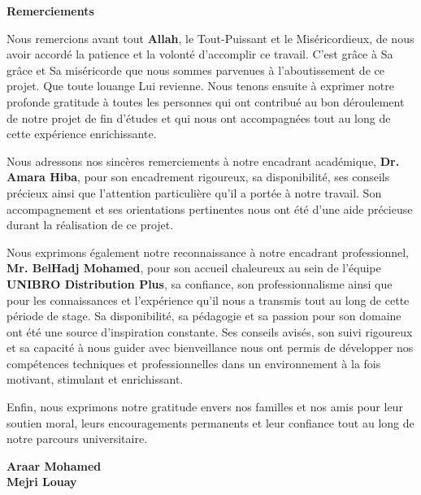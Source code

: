 \begin{titlepage}
\thispagestyle{empty}
\vspace*{0.5cm}
\begin{center}
{\Huge \textbf{Remerciements}}
\end{center}
\vspace{0.5cm}

Nous remercions avant tout \textbf{Allah}, le Tout-Puissant et le
Miséricordieux, de nous avoir accordé la patience et la volonté d'accomplir ce travail. C'est grâce à Sa grâce et Sa
miséricorde que nous sommes parvenues à l'aboutissement de ce projet.
Que toute louange Lui revienne.
Nous tenons ensuite à exprimer notre profonde gratitude à toutes les
personnes qui ont contribué au bon déroulement de notre projet de fin
d'études et qui nous ont accompagnées tout au long de cette expérience
enrichissante.

\vspace{0.3cm}

Nous adressons nos sincères remerciements à notre encadrant académique,
\textbf{Dr. Amara Hiba}, pour son encadrement rigoureux, sa disponibilité,
ses conseils précieux ainsi que l'attention particulière qu'il a portée à
notre travail. Son accompagnement et ses orientations pertinentes nous ont
été d'une aide précieuse durant la réalisation de ce projet.

\vspace{0.3cm}

Nous exprimons également notre reconnaissance à notre encadrant professionnel,
\textbf{Mr. BelHadj Mohamed}, pour son accueil chaleureux au sein de
l'équipe \textbf{UNIBRO Distribution Plus}, sa confiance, son professionnalisme ainsi
que pour les connaissances et l'expérience qu'il nous a transmis tout au long
de cette période de stage. Sa disponibilité, sa pédagogie et sa passion pour
son domaine ont été une source d'inspiration constante. Ses conseils avisés,
son suivi rigoureux et sa capacité à nous guider avec bienveillance nous ont
permis de développer nos compétences techniques et professionnelles dans un
environnement à la fois motivant, stimulant et enrichissant.

\vspace{0.3cm}

Enfin, nous exprimons notre gratitude envers nos familles et nos amis pour
leur soutien moral, leurs encouragements permanents et leur confiance tout
au long de notre parcours universitaire.

\vspace{0.4cm}
\begin{flushright}
\textbf{Araar Mohamed}\\
\textbf{Mejri Louay}
\end{flushright}
\end{titlepage}